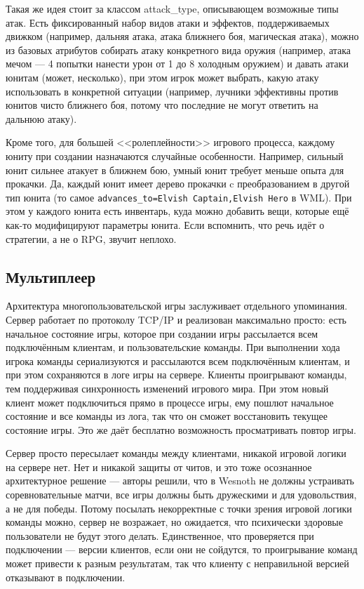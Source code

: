 \documentclass[a5paper]{article}
\begin{document}
Такая же идея стоит за классом attack\_type, описывающем возможные типы атак. Есть фиксированный набор видов атаки и эффектов, поддерживаемых движком (например, дальняя атака, атака ближнего боя, магическая атака), можно из базовых атрибутов собирать атаку конкретного вида оружия (например, атака мечом --- 4 попытки нанести урон от 1 до 8 холодным оружием) и давать атаки юнитам (может, несколько), при этом игрок может выбрать, какую атаку использовать в конкретной ситуации (например, лучники эффективны против юнитов чисто ближнего боя, потому что последние не могут ответить на дальнюю атаку).

Кроме того, для большей <<ролеплейности>> игрового процесса, каждому юниту при создании назначаются случайные особенности. Например, сильный юнит сильнее атакует в ближнем бою, умный юнит требует меньше опыта для прокачки. Да, каждый юнит имеет дерево прокачки c преобразованием в другой тип юнита (то самое \texttt{advances_to=Elvish Captain,Elvish Hero} в WML). При этом у каждого юнита есть инвентарь, куда можно добавить вещи, которые ещё как-то модифицируют параметры юнита. Если вспомнить, что речь идёт о стратегии, а не о RPG, звучит неплохо.

\subsection{Мультиплеер}

Архитектура многопользовательской игры заслуживает отдельного упоминания. Сервер работает по протоколу TCP/IP и реализован максимально просто: есть начальное состояние игры, которое при создании игры рассылается всем подключённым клиентам, и пользовательские команды. При выполнении хода игрока команды сериализуются и рассылаются всем подключённым клиентам, и при этом сохраняются в логе игры на сервере. Клиенты проигрывают команды, тем поддерживая синхронность изменений игрового мира. При этом новый клиент может подключиться прямо в процессе игры, ему пошлют начальное состояние и все команды из лога, так что он сможет восстановить текущее состояние игры. Это же даёт бесплатно возможность просматривать повтор игры.

Сервер просто пересылает команды между клиентами, никакой игровой логики на сервере нет. Нет и никакой защиты от читов, и это тоже осознанное архитектурное решение --- авторы решили, что в Wesnoth не должны устраивать соревновательные матчи, все игры должны быть дружескими и для удовольствия, а не для победы. Потому посылать некорректные с точки зрения игровой логики команды можно, сервер не возражает, но ожидается, что психически здоровые пользователи не будут этого делать. Единственное, что проверяется при подключении --- версии клиентов, если они не сойдутся, то проигрывание команд может привести к разным результатам, так что клиенту с неправильной версией отказывают в подключении.
\end{document}
